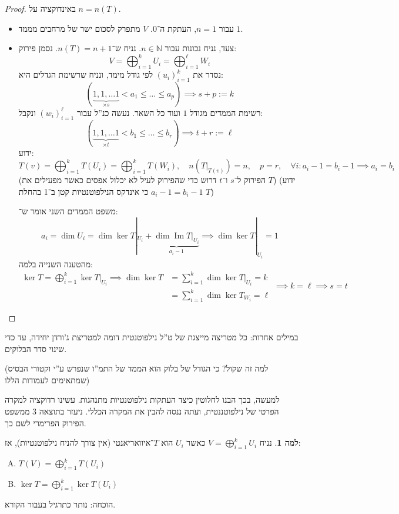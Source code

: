 \documentclass[a4paper]{article}
\newcommand\N     {\mathbb{N}}
\newcommand\ml    {\ell}
\DeclareMathOperator\Img   {Im}
\newcommand\co        {\colon}
\newcommand\cl [1]    {\left ( #1 \right )}
\theoremstyle{definition}
\newtheorem{Lemma}{\color{myyellow}למה}
\newcommand\lem   [1] {\begin{Lemma}#1\end{Lemma}}
\begin{document}
	\begin{proof}
		באינדוקציה על $n  = n(T)$. 
		\begin{itemize}
			\item עבור $n = 1$, העתקת ה־‏$0$. $V$ מתפרק לסכום ישר של מרחבים מממד $1$. 
			\item צעד, נניח נכונות עבור $n \in \N$. נניח ש־$n(T) = n + 1$. נסמן פירוק: 
			\[ V = \bigoplus_{i = 1}^{k} U_i = \bigoplus_{i = 1}^{\ml} W_i \]
			נסדר את $(u_i)_{i =1}^{k}$ לפי גודל מימד, ונניח שרשימת הגדלים היא: 
			\[ (\underbrace{1, 1, \dots 1 }_{\times s}< a_1 \le \dots \le a_{p}) \implies s + p := k \]
			רשימת הממדים מגודל $1$ ועוד כל השאר. נעשה כנ''ל עבור $(w_i)_{i = 1}^{\ml}$ ונקבל: 
			\[ (\underbrace{1, 1, \dots 1}_{\times t} < b_1 \le \dots \le b_r) \implies t + r := \ml \]
			ידוע:
			\[ T(v) = \bigoplus_{i = 1}^{k} T(U_i) = \bigoplus_{i = 1}^{k} T(W_i), \quad n\cl{T|_{{T(v)}}} = n, \quad p = r, \quad \forall i \co a_i - 1 = b_i - 1 \implies a_i = b_i \]
			(הפירוק ל־$s$ ו־$t$ דרוש כדי שהפירוק לעיל לא יכלול אפסים כאשר מפעילים את $T$)
			(ידוע $a_i - 1 = b_i - 1$ כי אינדקס הנילפוטנטיות קטן ב־1 בהחלת $T$)
			
			משפט הממדים השני אומר ש־: 
			\[ a_i = \dim U_i = \dim \ker T|_{{U_i}} + \underbrace{\dim \Img T|_{{U_i}}}_{a_i - 1} \implies \dim \ker T|_{{U_i}} = 1 \]
			מהטענה השנייה בלמה: 
			\[ \begin{aligned}
				\ker T = \bigoplus_{i = 1}^{k} \ker T|_{{U_i}} \implies \dim \ker T &= \sum_{i = 1}^k \dim \ker T|_{{U_i}} = k \\
				&= \sum_{i = 1}^{k} \dim \ker T_{W_i} = \ml
			\end{aligned}\implies k = \ml \implies s = t \]
		\end{itemize}
	\end{proof}
	
	במילים אחרות: כל מטריצה מייצגת של ט''ל נילפוטנטית דומה למטריצת ג'ורדן יחידה, עד כדי שינוי סדר הבלוקים. 
	
	(למה זה שקול? כי הגודל של בלוק הוא הממד של התמ''ו שנפרש ע''י וקטורי הבסיס שמתאימים לעמודות הללו)
	
	למעשה, בכך הבנו לחלוטין כיצד העתקות נילפוטנטיות מתנהגות. עשינו רדוקציה למקרה הפרטי של נילפוטננטית, ועתה ננסה להבין את המקרה הכללי. ניעזר בתוצאה 3 ממשפט הפירוק הפרימרי לשם כך. 
	
	\lem{נניח $V = \bigoplus_{i = 1}^{k} U_i$ כאשר $U_i$ הוא $T$־איוואריאנטי (אין צורך להניח נילפוטנטיות), אז: 
		\begin{enumerate}[A.]
			\item \hfil $\displaystyle T(V) = \bigoplus_{i = 1}^{k}T(U_i)$
			\item \hfil $\displaystyle \ker T = \bigoplus_{i = 1}^k \ker T(U_i)$
	\end{enumerate}}
	הוכחה: נותר כתרגיל בעבור הקורא. 
	
\end{document}
